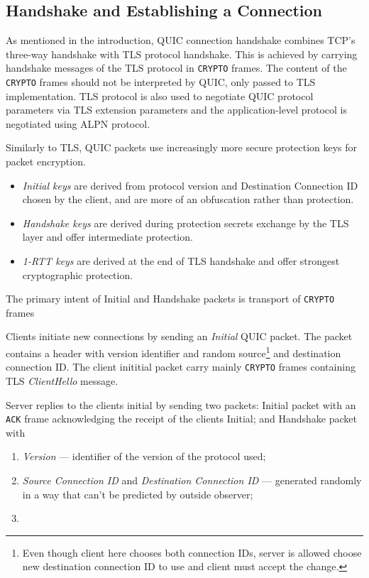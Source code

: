 \subsection{Handshake and Establishing a Connection}

As mentioned in the introduction, QUIC connection handshake combines TCP's three-way handshake with
TLS protocol handshake. This is achieved by carrying handshake messages of the TLS protocol in
\texttt{CRYPTO} frames. The content of the \texttt{CRYPTO} frames should not be interpreted by QUIC,
only passed to TLS implementation. TLS protocol is also used to negotiate QUIC protocol parameters
via TLS extension parameters and the application-level protocol is negotiated using ALPN
 protocol.

Similarly to TLS, QUIC packets use increasingly more secure
protection keys for packet encryption.

\begin{itemize}
  \item \textit{Initial keys} are derived from protocol version and Destination Connection ID chosen
    by the client, and are more of an obfuscation rather than protection.
  \item \textit{Handshake keys} are derived during protection secrets exchange by the TLS layer and
    offer intermediate protection.
  \item \textit{1-RTT keys} are derived at the end of TLS handshake and offer strongest
    cryptographic protection.
\end{itemize}

The primary intent of Initial and Handshake packets is transport of \texttt{CRYPTO} frames


Clients initiate new connections by sending an \textit{Initial} QUIC packet. The packet contains a
header with version identifier and random  source\footnote{Even though
client here chooses both connection IDs, server is allowed choose new destination connection ID to
use and client must accept the change.} and destination connection ID\@. The client inititial packet
carry mainly \texttt{CRYPTO} frames containing TLS \textit{ClientHello} message.

Server replies to the clients initial by sending two packets: Initial packet with an \texttt{ACK}
frame acknowledging the receipt of the clients Initial; and Handshake packet with

\begin{enumerate}
  \item \textit{Version} --- identifier of the version of the protocol used;
  \item \textit{Source Connection ID} and \textit{Destination Connection ID} --- generated randomly
    in a way that can't be predicted by outside observer;
  \item \textit{}
\end{enumerate}

